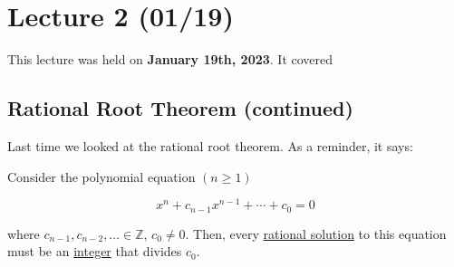 \chapter{Lecture 2 (01/19)}

This lecture was held on \textbf{January 19th, 2023}. It covered 

\section{Rational Root Theorem (continued)}

Last time we looked at the rational root theorem. As a reminder, it says: 

\begin{theorem}{}{}
    Consider the polynomial equation $(n \ge 1)$

    \[ x^n + c_{n-1}x^{n-1} + \cdots + c_0 = 0\] 

    where $c_{n-1}, c_{n-2}, \dots \in \mathbb Z$, $c_0 \neq 0$. Then, every \underline{rational solution} to this equation must be an \underline{integer} that divides $c_0$. 
\end{theorem}

